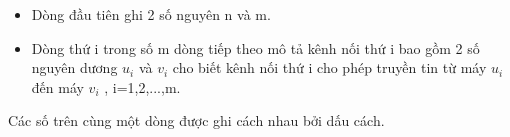 \begin{itemize}
	\item     Dòng đầu tiên ghi 2 số nguyên n và m.   
	\item     Dòng thứ i trong số m dòng tiếp theo mô tả kênh nối thứ i bao gồm 2 số nguyên dương $u_{i}$    và $v_{i}$    cho biết kênh nối thứ i cho phép truyền tin từ máy $u_{i}$    đến máy $v_{i}$    , i=1,2,...,m.   
\end{itemize}

   Các số trên cùng một dòng được ghi cách nhau bởi dấu cách.
